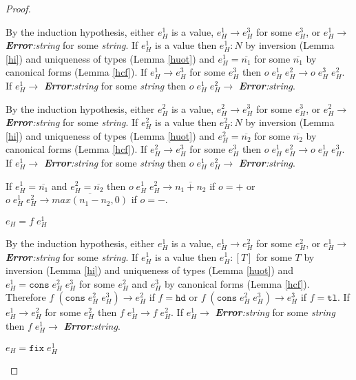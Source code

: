 \begin{theorem}
\begin{proof}
\begin{case}
By the induction hypothesis, either $e_{H}^{1}$ is a value, $e_{H}^{1}\rightarrow e_{H}^{3}$ for some $e_{H}^{3}$, or $e_{H}^{1}\rightarrow$ \emph{\textbf{Error}:\;string} for some \emph{string}.  If $e_{H}^{1}$ is a value then $e_{H}^{1}:N$ by inversion (Lemma \ref{hi}) and uniqueness of types (Lemma \ref{huot}) and $e_{H}^{1}=\overline{n_{1}}$ for some $\overline{n_{1}}$ by canonical forms (Lemma \ref{hcf}).  If $e_{H}^{1}\rightarrow e_{H}^{3}$ for some $e_{H}^{3}$ then $o\;e_{H}^{1}\;e_{H}^{2}\rightarrow o\;e_{H}^{3}\;e_{H}^{2}$.  If $e_{H}^{1}\rightarrow$ \emph{\textbf{Error}:\;string} for some \emph{string} then $o\;e_{H}^{1}\;e_{H}^{2}\rightarrow$ \emph{\textbf{Error}:\;string}.

By the induction hypothesis, either $e_{H}^{2}$ is a value, $e_{H}^{2}\rightarrow e_{H}^{3}$ for some $e_{H}^{3}$, or $e_{H}^{2}\rightarrow$ \emph{\textbf{Error}:\;string} for some \emph{string}.  If $e_{H}^{2}$ is a value then $e_{H}^{2}:N$ by inversion (Lemma \ref{hi}) and uniqueness of types (Lemma \ref{huot}) and $e_{H}^{2}=\overline{n_{2}}$ for some $\overline{n_{2}}$ by canonical forms (Lemma \ref{hcf}).  If $e_{H}^{2}\rightarrow e_{H}^{3}$ for some $e_{H}^{3}$ then $o\;e_{H}^{1}\;e_{H}^{2}\rightarrow o\;e_{H}^{1}\;e_{H}^{3}$.  If $e_{H}^{1}\rightarrow$ \emph{\textbf{Error}:\;string} for some \emph{string} then $o\;e_{H}^{1}\;e_{H}^{2}\rightarrow$ \emph{\textbf{Error}:\;string}.

If $e_{H}^{1}=\overline{n_{1}}$ and $e_{H}^{2}=\overline{n_{2}}$ then $o\;e_{H}^{1}\;e_{H}^{2}\rightarrow \overline{n_{1}+n_{2}}$ if $o=+$ or $o\;e_{H}^{1}\;e_{H}^{2}\rightarrow \overline{max(n_{1}-n_{2},0)}$ if $o=-$.
\end{case}
\begin{case}
$e_{H}=f\;e_{H}^{1}$

By the induction hypothesis, either $e_{H}^{1}$ is a value, $e_{H}^{1}\rightarrow e_{H}^{2}$ for some $e_{H}^{2}$, or $e_{H}^{1}\rightarrow$ \emph{\textbf{Error}:\;string} for some \emph{string}.  If $e_{H}^{1}$ is a value then $e_{H}^{1}:[T]$ for some $T$ by inversion (Lemma \ref{hi}) and uniqueness of types (Lemma \ref{huot}) and $e_{H}^{1}=\mathtt{cons}\;e_{H}^{2}\;e_{H}^{3}$ for some $e_{H}^{2}$ and $e_{H}^{3}$ by canonical forms (Lemma \ref{hcf}).  Therefore $f\;(\mathtt{cons}\;e_{H}^{2}\;e_{H}^{3})\rightarrow e_{H}^{2}$ if $f=\mathtt{hd}$ or $f\;(\mathtt{cons}\;e_{H}^{2}\;e_{H}^{3})\rightarrow e_{H}^{3}$ if $f=\mathtt{tl}$.  If $e_{H}^{1}\rightarrow e_{H}^{2}$ for some $e_{H}^{2}$ then $f\;e_{H}^{1}\rightarrow f\;e_{H}^{2}$.  If $e_{H}^{1}\rightarrow$ \emph{\textbf{Error}:\;string} for some \emph{string} then $f\;e_{H}^{1}\rightarrow$ \emph{\textbf{Error}:\;string}.
\end{case}
\begin{case}
$e_{H}=\mathtt{fix}\;e_{H}^{1}$


\end{case}
\end{proof}
\end{theorem}

